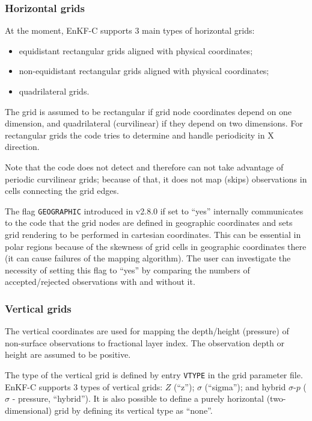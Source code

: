 \documentclass[11pt]{report}
\begin{document}
\subsubsection{Horizontal grids}
\label{sec:hgrid}

At the moment, EnKF-C supports 3 main types of horizontal grids:
\begin{itemize}
\item equidistant rectangular grids aligned with physical coordinates;
\item non-equidistant rectangular grids aligned with physical coordinates;
\item quadrilateral grids.
\end{itemize}
The grid is assumed to be rectangular if grid node coordinates depend on one dimension, and quadrilateral (curvilinear) if they depend on two dimensions.
For rectangular grids the code tries to determine and handle periodicity in X direction.

Note that the code does not detect and therefore can not take advantage of periodic curvilinear grids; because of that, it does not map (skips) observations in cells connecting the grid edges.

The flag \verb|GEOGRAPHIC| introduced in v2.8.0 if set to ``yes'' internally communicates to the code that the grid nodes are defined in geographic coordinates and sets grid rendering to be performed in cartesian coordinates.
This can be essential in polar regions because of the skewness of grid cells in geographic coordinates there (it can cause failures of the mapping algorithm).
The user can investigate the necessity of setting this flag to ``yes'' by comparing the numbers of accepted/rejected observations with and without it.

\subsubsection{Vertical grids}

The vertical coordinates are used for mapping the depth/height (pressure) of non-surface observations to fractional layer index.
The observation depth or height are assumed to be positive.

The type of the vertical grid is defined by entry \verb|VTYPE| in the grid parameter file.
EnKF-C supports 3 types of vertical grids: $Z$ (``z''); $\sigma$ (``sigma''); and hybrid $\sigma$-$p$ ($\sigma$ - pressure, ``hybrid'').
It is also possible to define a purely horizontal (two-dimensional) grid by defining its vertical type as ``none''.
\end{document}
